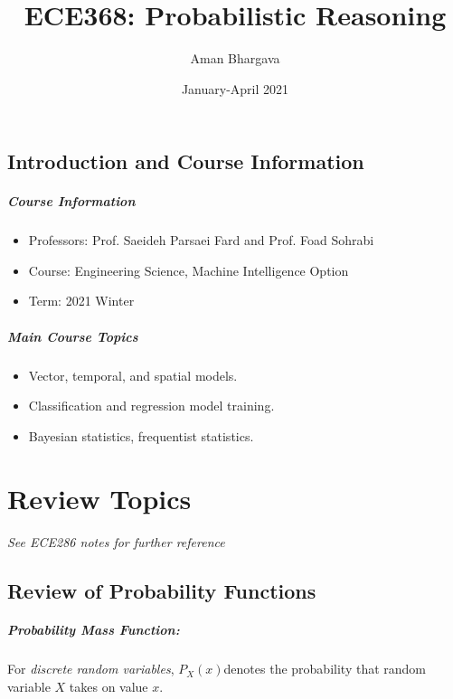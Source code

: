 \documentclass[a4paper,12pt]{report}
\begin{document}
\title{ECE368: Probabilistic Reasoning}
\author{Aman Bhargava}
\date{January-April 2021}
\maketitle

\tableofcontents

\section{Introduction and Course Information}

\paragraph{Course Information}
\begin{itemize}
\item Professors: Prof. Saeideh Parsaei Fard and Prof. Foad Sohrabi
\item Course: Engineering Science, Machine Intelligence Option
\item Term: 2021 Winter
\end{itemize}

\paragraph{Main Course Topics} 
\begin{itemize}
\item Vector, temporal, and spatial models.
\item Classification and regression model training.
\item Bayesian statistics, frequentist statistics.
\end{itemize}




\chapter{Review Topics}

\textit{See ECE286 notes for further reference} 

\section{Review of Probability Functions}

\paragraph{Probability Mass Function: } For \textit{discrete random variables}, $P_X(x)$denotes the probability that random variable $X$ takes on value $x$.
\end{document}
